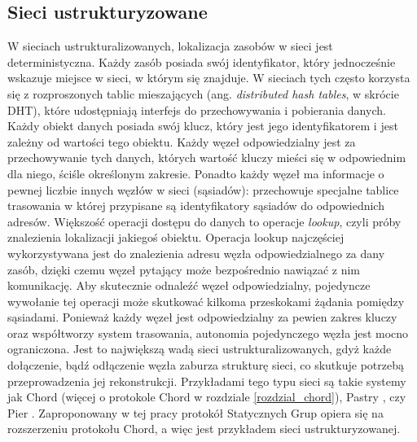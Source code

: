 \documentclass[12pt, twoside, openany]{report}
\begin{document}
\subsection{Sieci ustrukturyzowane}
W sieciach ustrukturalizowanych, lokalizacja zasobów w sieci jest deterministyczna. Każdy zasób posiada swój identyfikator, który jednocześnie wskazuje miejsce w sieci, w którym się znajduje. W sieciach tych często korzysta się z rozproszonych tablic mieszających (ang. \textit{distributed hash tables}, w skrócie DHT), które udostępniają interfejs do przechowywania i pobierania danych. Każdy obiekt danych posiada swój klucz, który jest jego identyfikatorem i jest zależny od wartości tego obiektu. Każdy węzeł odpowiedzialny jest za przechowywanie tych danych, których wartość kluczy mieści się w odpowiednim dla niego, ściśle określonym zakresie. Ponadto każdy węzeł ma informacje o pewnej liczbie innych węzłów w sieci (sąsiadów): przechowuje specjalne tablice trasowania w której przypisane są identyfikatory sąsiadów do odpowiednich adresów. Większość operacji dostępu do danych to operacje \textit{lookup}, czyli próby znalezienia lokalizacji jakiegoś obiektu. Operacja lookup najczęściej wykorzystywana jest do znalezienia adresu węzła odpowiedzialnego za dany zasób, dzięki czemu węzeł pytający może bezpośrednio nawiązać z nim komunikację. Aby skutecznie odnaleźć węzeł odpowiedzialny, pojedyncze wywołanie tej operacji może skutkować kilkoma przeskokami żądania pomiędzy sąsiadami. Ponieważ każdy węzeł jest odpowiedzialny za pewien zakres kluczy oraz współtworzy system trasowania, autonomia pojedynczego węzła jest mocno ograniczona. Jest to największą wadą sieci ustrukturalizowanych, gdyż każde dołączenie, bądź odłączenie węzła zaburza strukturę sieci, co skutkuje potrzebą przeprowadzenia jej rekonstrukcji. Przykładami tego typu sieci są takie systemy jak Chord (więcej o protokole Chord w rozdziale \ref{rozdzial_chord}), Pastry \cite{bib:pastry}, czy Pier \cite{bib:pier}. Zaproponowany w tej pracy protokół Statycznych Grup opiera się na rozszerzeniu protokołu Chord, a więc jest przykładem sieci ustrukturyzowanej.
\end{document}
